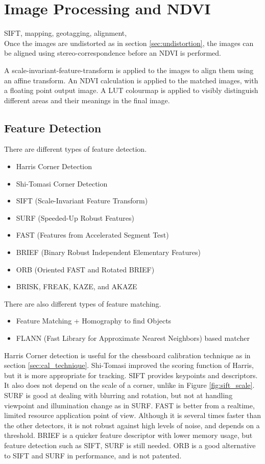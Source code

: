 \chapter{Image Processing and NDVI}
\label{sec:image_processing}
SIFT, mapping, geotagging, alignment,\\

Once the images are undistorted as in section \ref{sec:undistortion}, the images can be aligned using stereo-correspondence before an NDVI is performed.

A scale-invariant-feature-transform is applied to the images to align them using an affine transform. An NDVI calculation is applied to the matched images, with a floating point output image. A LUT colourmap is applied to visibly distinguish different areas and their meanings in the final image.

\section{Feature Detection}

There are different types of feature detection. 
\begin{itemize}
	\item Harris Corner Detection
	\item Shi-Tomasi Corner Detection
	\item SIFT (Scale-Invariant Feature Transform)
	\item SURF (Speeded-Up Robust Features)
	\item FAST (Features from Accelerated Segment Test)
	\item BRIEF (Binary Robust Independent Elementary Features)
	\item ORB (Oriented FAST and Rotated BRIEF)
	\item BRISK, FREAK, KAZE, and AKAZE
\end{itemize}

There are also different types of feature matching.

\begin{itemize}
	\item Feature Matching + Homography to find Objects
	\item FLANN (Fast Library for Approximate Nearest Neighbors) based matcher
\end{itemize}

Harris Corner detection is useful for the chessboard calibration technique as in section \ref{sec:cal_technique}. Shi-Tomasi improved the scoring function of Harris, but it is more appropriate for tracking. SIFT provides keypoints and descriptors. It also does not depend on the scale of a corner, unlike in Figure \ref{fig:sift_scale}. SURF is good at dealing with blurring and rotation, but not at handling viewpoint and illumination change as in SURF. FAST is better from a realtime, limited resource application point of view. Although it is several times faster than the other detectors, it is not robust against high levels of noise, and depends on a threshold. BRIEF is a quicker feature descriptor with lower memory usage, but feature detection such as SIFT, SURF is still needed. ORB is a good alternative to SIFT and SURF in performance, and is not patented.\\

